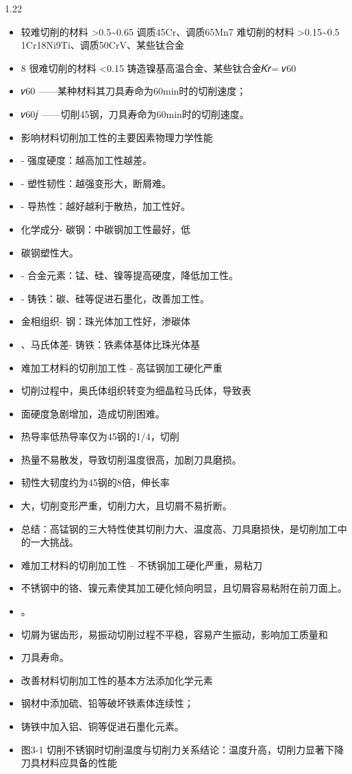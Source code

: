 \documentclass[12pt,a4paper]{article}
\begin{document}
\begin{spacing}{1.22}
\begin{itemize}[leftmargin=2.2em,label=--]
  \item 较难切削的材料 >0.5\textasciitilde{}0.65 调质45Cr、调质65Mn7 难切削的材料 >0.15\textasciitilde{}0.5 1Cr18Ni9Ti、调质50CrV、某些钛合金
  \item 8 很难切削的材料 <0.15 铸造镍基高温合金、某些钛合金𝐾𝑟= 𝑣60
  \item 𝑣60 ——某种材料其刀具寿命为60min时的切削速度；
  \item 𝑣60𝑗 ——切削45钢，刀具寿命为60min时的切削速度。
  \item 影响材料切削加工性的主要因素物理力学性能
  \item - 强度硬度：越高加工性越差。
  \item - 塑性韧性：越强变形大，断屑难。
  \item - 导热性：越好越利于散热，加工性好。
  \item 化学成分- 碳钢：中碳钢加工性最好，低
  \item 碳钢塑性大。
  \item - 合金元素：锰、硅、镍等提高硬度，降低加工性。
  \item - 铸铁：碳、硅等促进石墨化，改善加工性。
  \item 金相组织- 钢：珠光体加工性好，渗碳体
  \item 、马氏体差- 铸铁：铁素体基体比珠光体基
  \item 难加工材料的切削加工性 - 高锰钢加工硬化严重
  \item 切削过程中，奥氏体组织转变为细晶粒马氏体，导致表
  \item 面硬度急剧增加，造成切削困难。
  \item 热导率低热导率仅为45钢的1/4，切削
  \item 热量不易散发，导致切削温度很高，加剧刀具磨损。
  \item 韧性大韧度约为45钢的8倍，伸长率
  \item 大，切削变形严重，切削力大，且切屑不易折断。
  \item 总结：高锰钢的三大特性使其切削力大、温度高、刀具磨损快，是切削加工中的一大挑战。
  \item 难加工材料的切削加工性 – 不锈钢加工硬化严重，易粘刀
  \item 不锈钢中的铬、镍元素使其加工硬化倾向明显，且切屑容易粘附在前刀面上。
  \item 。
  \item 切屑为锯齿形，易振动切削过程不平稳，容易产生振动，影响加工质量和
  \item 刀具寿命。
  \item 改善材料切削加工性的基本方法添加化学元素
  \item 钢材中添加硫、铅等破坏铁素体连续性；
  \item 铸铁中加入铝、铜等促进石墨化元素。
  \item 图3-1 切削不锈钢时切削温度与切削力关系结论：温度升高，切削力显著下降刀具材料应具备的性能
\end{itemize}


\end{spacing}
\end{document}
